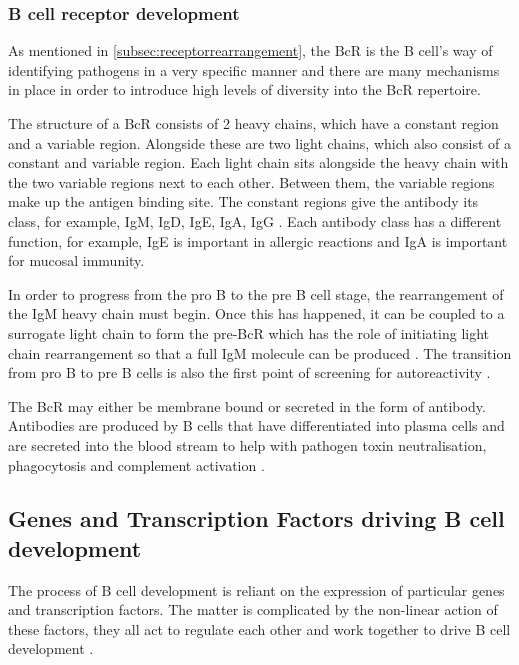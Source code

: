 \subsubsection{B cell receptor development}
\label{subsubsec:Bcellrecepdevelopment}

As mentioned in \cref{subsec:receptorrearrangement}, the BcR is the B cell's way of identifying pathogens in a very specific manner and there are many mechanisms in place in order to introduce high levels of diversity into the BcR repertoire.

The structure of a BcR consists of 2 heavy chains, which have a constant region and a variable region.
Alongside these are two light chains, which also consist of a constant and variable region.
Each light chain sits alongside the heavy chain with the two variable regions next to each other.
Between them, the variable regions make up the antigen binding site.
The constant regions give the antibody its class, for example, IgM, IgD, IgE, IgA, IgG \citep{Pieper2013}.
Each antibody class has a different function, for example, IgE is important in allergic reactions and IgA is important for mucosal immunity.

In order to progress from the pro B to the pre B cell stage, the rearrangement of the IgM heavy chain must begin.
Once this has happened, it can be coupled to a surrogate light chain to form the pre-BcR which has the role of initiating light chain rearrangement so that a full IgM molecule can be produced \citep{Burrows2002}.
The transition from pro B to pre B cells is also the first point of screening for autoreactivity \citep{Pieper2013}.

The BcR may either be membrane bound or secreted in the form of antibody.
Antibodies are produced by B cells that have differentiated into plasma cells and are secreted into the blood stream to help with pathogen toxin neutralisation, phagocytosis and complement activation \citep{Janeway2008}.


\subsection{Genes and Transcription Factors driving B cell development}
\label{subsec:Bcellgenes}

The process of B cell development is reliant on the expression of particular genes and transcription factors.
The matter is complicated by the non-linear action of these factors, they all act to regulate each other and work together to drive B cell development \citep{Mandel2010}.

